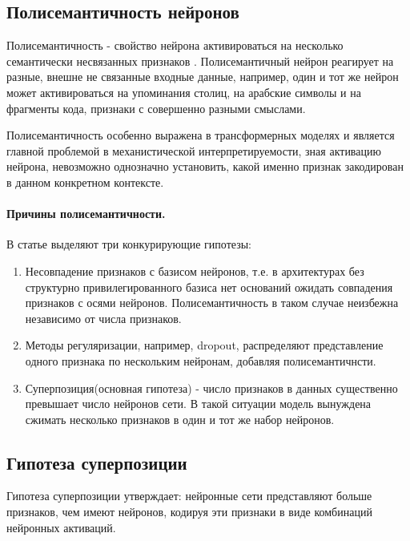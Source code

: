 \documentclass[a4paper,14pt]{extreport}
\begin{document}
\subsection{Полисемантичность нейронов}

Полисемантичность - свойство нейрона активироваться 
на несколько семантически несвязанных признаков \cite{bereska2024mechanistic}.
Полисемантичный нейрон реагирует на разные, внешне не связанные входные данные, например,
один и тот же нейрон может активироваться на упоминания столиц, на арабские символы и
на фрагменты кода, признаки с совершенно разными смыслами.

Полисемантичность особенно выражена в трансформерных моделях и является главной
проблемой в механистической интерпретируемости, зная активацию нейрона,
невозможно однозначно установить, какой именно признак закодирован в данном
конкретном контексте.

\paragraph{Причины полисемантичности.}
В статье \cite{bereska2024mechanistic} выделяют три конкурирующие гипотезы:

\begin{enumerate}
    \item Несовпадение признаков с базисом нейронов, т.е. в архитектурах без
          структурно привилегированного базиса нет оснований ожидать совпадения
          признаков с осями нейронов. Полисемантичность в таком случае неизбежна
          независимо от числа признаков.

    \item Методы регуляризации, например, dropout, распределяют представление одного признака 
          по нескольким нейронам, добавляя полисемантичнсти.

    \item Суперпозиция(основная гипотеза) - число признаков в данных существенно превышает число нейронов сети. 
          В такой ситуации модель вынуждена сжимать несколько признаков в один
          и тот же набор нейронов.
\end{enumerate}

\subsection{Гипотеза суперпозиции}

Гипотеза суперпозиции \cite{elhage2022superposition} утверждает:
нейронные сети представляют больше признаков, чем имеют нейронов,
кодируя эти признаки в виде комбинаций нейронных активаций.
\end{document}

